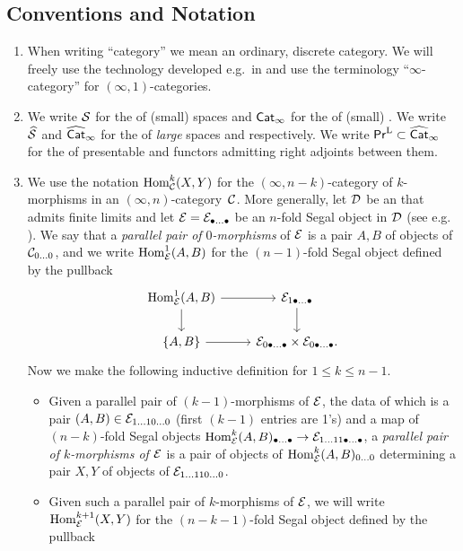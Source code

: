 \documentclass[10pt, reqno, twoside
, final
]{amsart}
\numberwithin{equation}{subsection}%
\theoremstyle{definition}
\theoremstyle{definition}
\theoremstyle{definition}
\theoremstyle{definition}
\theoremstyle{definition}
\theoremstyle{definition}
\theoremstyle{definition}
\theoremstyle{definition}
\theoremstyle{definition}
\theoremstyle{plain}
\theoremstyle{definition}
\theoremstyle{plain}
\theoremstyle{definition}
\theoremstyle{plain}
\theoremstyle{definition}
\theoremstyle{definition}
\theoremstyle{plain}
\theoremstyle{plain}
\theoremstyle{definition}
\theoremstyle{plain}
\theoremstyle{plain}
\theoremstyle{plain}
\begin{document}
\subsection{Conventions and Notation}
\begin{enumerate}
    \item When writing ``category'' we  mean an ordinary, discrete category.
    We will freely use the technology developed e.g.~in \cite{Joyal, LurHTT, LurHA} and use the terminology ``$\infty$-category'' for $(\infty,1)$-categories.
    \item We write $\mathcal{S}$ for the \infcat of (small) spaces and $\mathsf{Cat}_{\infty}$ for the \infcat of (small) \infcatst. We write $\widehat{\mathcal{S}}$ and $\widehat{\mathsf{Cat}}_{\infty}$ for the \infcats of \emph{large} spaces and \infcats respectively. We write $\mathsf{Pr}^{\mathrm{L}}\subset \widehat{\mathsf{Cat}}_{\infty}$ for the \infcat of presentable \infcats and functors admitting right adjoints between them.
    \item We use the notation $\mathrm{Hom}^k_{\mathcal{C}}(X,Y)$ for the $(\infty,n-k)$-category of $k$-morphisms in an $(\infty,n)$-category~$\mathcal{C}$. More generally, let $\mathcal{D}$ be an \infcat that admits finite limits and let $\mathcal{E}=\mathcal{E}_{\bullet\ldots\bullet}$ be an $n$-fold Segal object in $\mathcal{D}$ (see e.g. \cite[Section 4]{Haugseng-iteratedspans}). We say that a \emph{parallel pair of $0$-morphisms} of $\mathcal{E}$ is a pair $A,B$ of objects of $\mathcal{C}_{0\ldots 0}$, and we write $\mathrm{Hom}^1_{\mathcal{E}}(A,B)$ for the $(n-1)$-fold Segal object defined by the pullback
    \[
        \begin{tikzcd}
        \Hom^{1}_{\icate}(A,B)\ar[d] \ar[r]& \icate_{1\bullet\ldots\bullet} \ar[d] \\
        \{A,B\} \ar[r] &  \icate_{0\bullet\ldots\bullet}  \times \icate_{0\bullet\ldots\bullet}. 
        \end{tikzcd}
    \]
    Now we make the following inductive definition for $1\leq k\leq n-1$.
    \begin{itemize}
        \item Given a parallel pair of $(k-1)$-morphisms of $\mathcal{E}$, the data of which is a pair $(A,B)\in \mathcal{E}_{1\ldots 10\ldots0}$ (first $(k-1)$ entries are 1's) and a map of $(n-k)$-fold Segal objects $\mathrm{Hom}_{\mathcal{E}}^{k}(A,B)_{\bullet\ldots\bullet}\rightarrow \mathcal{E}_{1\ldots 11\bullet\ldots\bullet}$, a \emph{parallel pair of $k$-morphisms of $\mathcal{E}$} is a pair of objects of $\mathrm{Hom}_{\mathcal{E}}^{k}(A,B)_{0\ldots 0}$ determining a pair $X,Y$ of objects of $\mathcal{E}_{{1\ldots 110\ldots0}}$.
        \item Given such a parallel pair of $k$-morphisms of $\mathcal{E}$, we will write $\mathrm{Hom}^{k+1}_{\mathcal{E}}(X,Y)$ for the $(n-k-1)$-fold Segal object defined by the pullback 

\end{itemize}
\end{enumerate}
\end{document}
